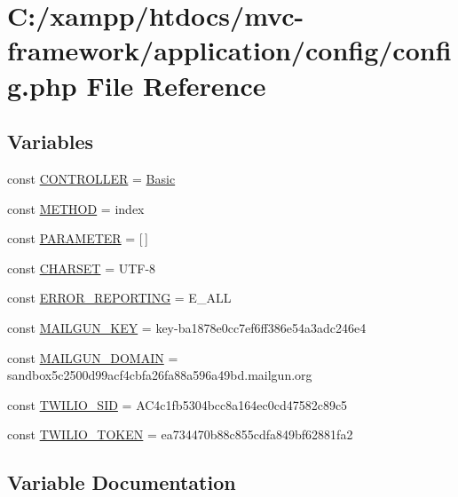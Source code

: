 \hypertarget{config_8php}{}\section{C\+:/xampp/htdocs/mvc-\/framework/application/config/config.php File Reference}
\label{config_8php}
\subsection*{Variables}
\begin{DoxyCompactItemize}
\item 
const \hyperlink{config_8php_afa55a6839ec4ad32fc00879d78229356}{C\+O\+N\+T\+R\+O\+L\+L\+ER} = \textquotesingle{}\hyperlink{class_basic}{Basic}\textquotesingle{}
\item 
const \hyperlink{config_8php_a9d70943cac2f50debb62d2008a6e768d}{M\+E\+T\+H\+OD} = \textquotesingle{}index\textquotesingle{}
\item 
const \hyperlink{config_8php_a75466fbd8ac40be3d3c185c9974118e7}{P\+A\+R\+A\+M\+E\+T\+ER} = \mbox{[}$\,$\mbox{]}
\item 
const \hyperlink{config_8php_a4ca86066304d2cbb779bd8afd1efe17b}{C\+H\+A\+R\+S\+ET} = \textquotesingle{}U\+TF-\/8\textquotesingle{}
\item 
const \hyperlink{config_8php_a80c2f40a4ce1ad3cbfb1978239f63c31}{E\+R\+R\+O\+R\+\_\+\+R\+E\+P\+O\+R\+T\+I\+NG} = E\+\_\+\+A\+LL
\item 
const \hyperlink{config_8php_ad320bd8d96c22e094fb9b774f269aaef}{M\+A\+I\+L\+G\+U\+N\+\_\+\+K\+EY} = \textquotesingle{}key-\/ba1878e0cc7ef6ff386e54a3adc246e4\textquotesingle{}
\item 
const \hyperlink{config_8php_a2de069ac064bb137af53d99e3fcff3c8}{M\+A\+I\+L\+G\+U\+N\+\_\+\+D\+O\+M\+A\+IN} = \textquotesingle{}sandbox5c2500d99acf4cbfa26fa88a596a49bd.\+mailgun.\+org\textquotesingle{}
\item 
const \hyperlink{config_8php_a9b6aafbdebd605cd4fb6f5749b53e59f}{T\+W\+I\+L\+I\+O\+\_\+\+S\+ID} = \textquotesingle{}A\+C4c1fb5304bcc8a164ec0cd47582c89c5\textquotesingle{}
\item 
const \hyperlink{config_8php_a0477d5c66524299f08cae7376eb7884c}{T\+W\+I\+L\+I\+O\+\_\+\+T\+O\+K\+EN} = \textquotesingle{}ea734470b88c855cdfa849bf62881fa2\textquotesingle{}
\end{DoxyCompactItemize}


\subsection{Variable Documentation}
\hypertarget{config_8php_a4ca86066304d2cbb779bd8afd1efe17b}{}\label{config_8php_a4ca86066304d2cbb779bd8afd1efe17b} 
